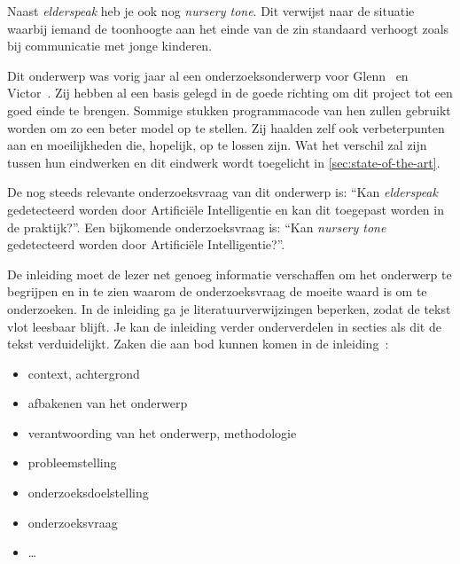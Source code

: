 Naast \textit{elderspeak} heb je ook nog \textit{nursery tone}. Dit verwijst naar de situatie waarbij iemand de toonhoogte aan het einde van de zin standaard verhoogt zoals bij communicatie met jonge kinderen.

Dit onderwerp was vorig jaar al een onderzoeksonderwerp voor Glenn~\textcite{Beeckman2021} en Victor~\textcite{Standaert2021}.
Zij hebben al een basis gelegd in de goede richting om dit project tot een goed einde te brengen.
Sommige stukken programmacode van hen zullen gebruikt worden om zo een beter model op te stellen.
Zij haalden zelf ook verbeterpunten aan en moeilijkheden die, hopelijk, op te lossen zijn. Wat het verschil zal zijn tussen hun eindwerken en dit eindwerk wordt toegelicht in \ref{sec:state-of-the-art}.

De nog steeds relevante onderzoeksvraag van dit onderwerp is: ``Kan \textit{elderspeak} gedetecteerd worden door Artificiële Intelligentie en kan dit toegepast worden in de praktijk?''. Een bijkomende onderzoeksvraag is: ``Kan \textit{nursery tone} gedetecteerd worden door Artificiële Intelligentie?''.


\color{blue}
De inleiding moet de lezer net genoeg informatie verschaffen om het onderwerp te begrijpen en in te zien waarom de onderzoeksvraag de moeite waard is om te onderzoeken. In de inleiding ga je literatuurverwijzingen beperken, zodat de tekst vlot leesbaar blijft. Je kan de inleiding verder onderverdelen in secties als dit de tekst verduidelijkt. Zaken die aan bod kunnen komen in de inleiding~\autocite{Pollefliet2011}:

\begin{itemize}
  \item context, achtergrond
  \item afbakenen van het onderwerp
  \item verantwoording van het onderwerp, methodologie
  \item probleemstelling
  \item onderzoeksdoelstelling
  \item onderzoeksvraag
  \item \ldots
\end{itemize}

\color{black}

\section{}
\label{sec:probleemstelling}


